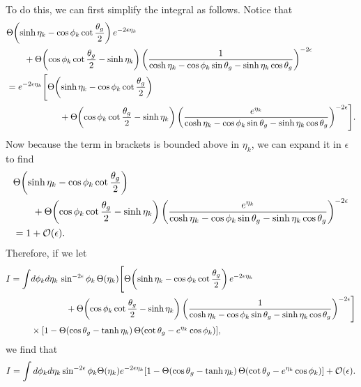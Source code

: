 \documentclass[11pt,twoside,reqno]{amsart}
\theoremstyle{plain}
\theoremstyle{remark}
\theoremstyle{definition}
\theoremstyle{remark}
\theoremstyle{definition}
\theoremstyle{definition}
\newcommand{\cO}{\mathcal{O}}
\begin{document}
	To do this, we can first simplify the integral as follows. Notice that
	\begin{equation}
	\begin{aligned}
		&\Theta\qty(\sinh\eta_k - \cos\phi_k\cot\frac{\theta_g}{2})\,e^{-2\epsilon\eta_k} \\
			&\qquad+ \Theta\qty(\cos\phi_k\cot\frac{\theta_g}{2} - \sinh\eta_k)\, \qty(\frac{1}{\cosh\eta_k - \cos\phi_k\sin\theta_g - \sinh\eta_k\cos\theta_g})^{-2\epsilon} \\
		&= e^{-2\epsilon\eta_k} \Bigg[\Theta\qty(\sinh\eta_k - \cos\phi_k\cot\frac{\theta_g}{2}) \\
			&\qquad\qquad\qquad + \Theta\qty(\cos\phi_k\cot\frac{\theta_g}{2} - \sinh\eta_k)\, \qty(\frac{e^{\eta_k}}{\cosh\eta_k - \cos\phi_k\sin\theta_g - \sinh\eta_k\cos\theta_g})^{-2\epsilon}\Bigg].
	\end{aligned}
	\end{equation}
	Now because the term in brackets is bounded above in $\eta_k$, we can expand it in $\epsilon$ to find
	\begin{equation}
	\begin{aligned}
		&\Theta\qty(\sinh\eta_k - \cos\phi_k\cot\frac{\theta_g}{2}) \\
			&\qquad+ \Theta\qty(\cos\phi_k\cot\frac{\theta_g}{2} - \sinh\eta_k)\, \qty(\frac{e^{\eta_k}}{\cosh\eta_k - \cos\phi_k\sin\theta_g - \sinh\eta_k\cos\theta_g})^{-2\epsilon} \\
		&= 1 + \cO(\epsilon).
	\end{aligned}
	\end{equation}
	Therefore, if we let
	\begin{equation}
	\begin{aligned}
		I = \int &d\phi_k d\eta_k\, \sin^{-2\epsilon}\phi_k \, \Theta(\eta_k) \Bigg[ \Theta\qty(\sinh\eta_k - \cos\phi_k\cot\frac{\theta_g}{2})\,e^{-2\epsilon\eta_k} \\
			&\qquad\qquad+ \Theta\qty(\cos\phi_k\cot\frac{\theta_g}{2} - \sinh\eta_k)\, \qty(\frac{1}{\cosh\eta_k - \cos\phi_k\sin\theta_g - \sinh\eta_k\cos\theta_g})^{-2\epsilon}\Bigg] \\
			&\times \qty[1 - \Theta(\cos\theta_g - \tanh\eta_k)\,\Theta\qty(\cot\theta_g - e^{\eta_k}\cos\phi_k)],
	\end{aligned}
	\end{equation}
	we find that
	\begin{equation}
		I = \int d\phi_k d\eta_k \sin^{-2\epsilon}\phi_k \Theta(\eta_k) e^{-2\epsilon\eta_k} \qty[1 - \Theta(\cos\theta_g - \tanh\eta_k)\,\Theta\qty(\cot\theta_g - e^{\eta_k}\cos\phi_k)] + \cO(\epsilon).
	\end{equation}
\end{document}
